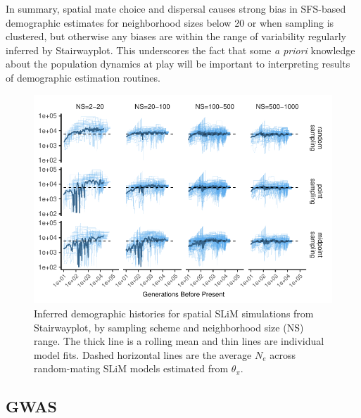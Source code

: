 \documentclass[11pt,twoside,lineno]{preprint}
\begin{document}
In summary, spatial mate choice and dispersal causes strong bias in SFS-based demographic estimates for neighborhood sizes below 20 or when sampling is clustered, but otherwise any biases are within the range of variability regularly inferred by Stairwayplot. This underscores the fact that some \textit{a priori} knowledge about the population dynamics at play will be important to interpreting results of demographic estimation routines. 


\begin{figure}[p]
\centering
\includegraphics[width=\textwidth]{figures/stairwayplot_facet_rollmean.pdf}
\caption{Inferred demographic histories for spatial SLiM simulations from Stairwayplot, by sampling scheme and neighborhood size (NS) range. The thick line is a rolling mean and thin lines are individual model fits. Dashed horizontal lines are the average $N_{e}$ across random-mating SLiM models estimated from $\theta_{\pi}$.}
\label{fig:demography}
\end{figure}

\subsection{GWAS}
\end{document}
